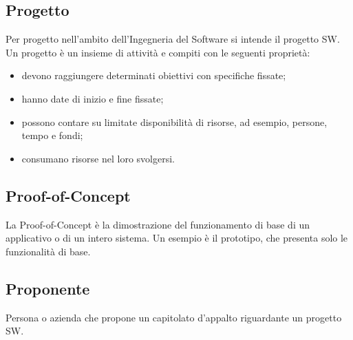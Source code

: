     \subsection*{Progetto}

        Per progetto nell'ambito dell'Ingegneria del Software si intende il progetto SW.
        Un progetto è un insieme di attività e compiti con le seguenti proprietà:

        \begin{itemize}
            \item devono raggiungere determinati obiettivi con specifiche fissate;
            \item hanno date di inizio e fine fissate;
            \item possono contare su limitate disponibilità di risorse, ad esempio, persone, tempo e fondi;
            \item consumano risorse nel loro svolgersi.
        \end{itemize}

    \subsection*{Proof-of-Concept}

        La Proof-of-Concept è la dimostrazione del funzionamento di base di un applicativo o di un intero sistema.
        Un esempio è il prototipo, che presenta solo le funzionalità di base.

    \subsection*{Proponente}

        Persona o azienda che propone un capitolato d'appalto riguardante un progetto SW.

